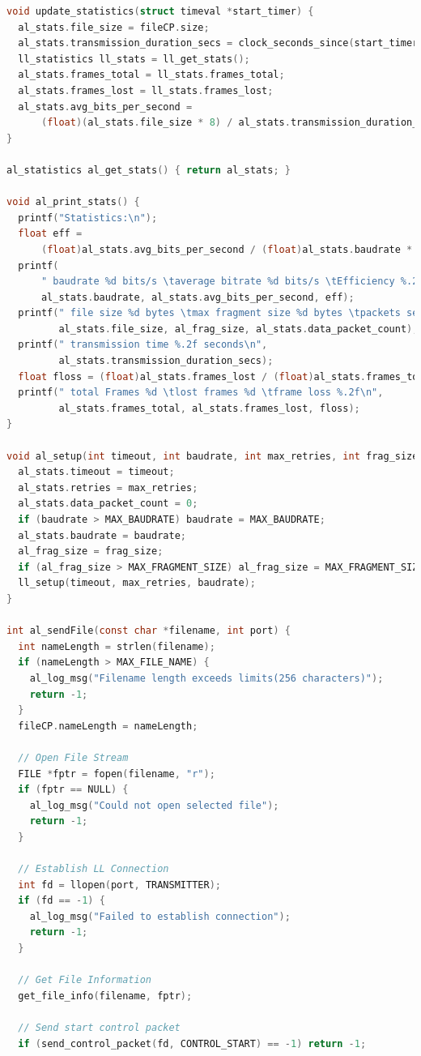 \documentclass[11pt]{article}
\begin{document}
\begin{lstlisting}[language=C]
void update_statistics(struct timeval *start_timer) {
  al_stats.file_size = fileCP.size;
  al_stats.transmission_duration_secs = clock_seconds_since(start_timer);
  ll_statistics ll_stats = ll_get_stats();
  al_stats.frames_total = ll_stats.frames_total;
  al_stats.frames_lost = ll_stats.frames_lost;
  al_stats.avg_bits_per_second =
      (float)(al_stats.file_size * 8) / al_stats.transmission_duration_secs;
}

al_statistics al_get_stats() { return al_stats; }

void al_print_stats() {
  printf("Statistics:\n");
  float eff =
      (float)al_stats.avg_bits_per_second / (float)al_stats.baudrate * 100.0f;
  printf(
      " baudrate %d bits/s \taverage bitrate %d bits/s \tEfficiency %.2f%% \n",
      al_stats.baudrate, al_stats.avg_bits_per_second, eff);
  printf(" file size %d bytes \tmax fragment size %d bytes \tpackets sent %d\n",
         al_stats.file_size, al_frag_size, al_stats.data_packet_count);
  printf(" transmission time %.2f seconds\n",
         al_stats.transmission_duration_secs);
  float floss = (float)al_stats.frames_lost / (float)al_stats.frames_total;
  printf(" total Frames %d \tlost frames %d \tframe loss %.2f\n",
         al_stats.frames_total, al_stats.frames_lost, floss);
}

void al_setup(int timeout, int baudrate, int max_retries, int frag_size) {
  al_stats.timeout = timeout;
  al_stats.retries = max_retries;
  al_stats.data_packet_count = 0;
  if (baudrate > MAX_BAUDRATE) baudrate = MAX_BAUDRATE;
  al_stats.baudrate = baudrate;
  al_frag_size = frag_size;
  if (al_frag_size > MAX_FRAGMENT_SIZE) al_frag_size = MAX_FRAGMENT_SIZE;
  ll_setup(timeout, max_retries, baudrate);
}

int al_sendFile(const char *filename, int port) {
  int nameLength = strlen(filename);
  if (nameLength > MAX_FILE_NAME) {
    al_log_msg("Filename length exceeds limits(256 characters)");
    return -1;
  }
  fileCP.nameLength = nameLength;

  // Open File Stream
  FILE *fptr = fopen(filename, "r");
  if (fptr == NULL) {
    al_log_msg("Could not open selected file");
    return -1;
  }

  // Establish LL Connection
  int fd = llopen(port, TRANSMITTER);
  if (fd == -1) {
    al_log_msg("Failed to establish connection");
    return -1;
  }

  // Get File Information
  get_file_info(filename, fptr);

  // Send start control packet
  if (send_control_packet(fd, CONTROL_START) == -1) return -1;


\end{lstlisting}
\end{document}
